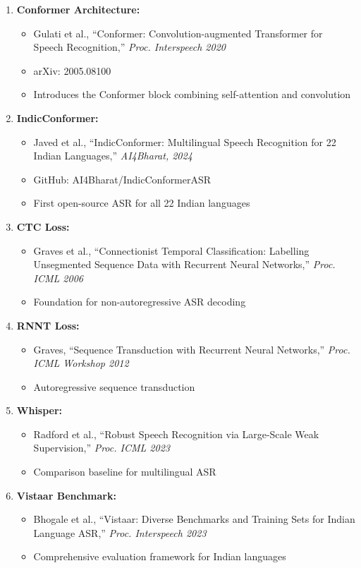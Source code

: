 \documentclass[12pt,a4paper]{article}
\begin{document}
\begin{enumerate}[leftmargin=*]
\item \textbf{Conformer Architecture:}
  \begin{itemize}
  \item Gulati et al., ``Conformer: Convolution-augmented Transformer for Speech Recognition,'' \textit{Proc. Interspeech 2020}
  \item arXiv: 2005.08100
  \item Introduces the Conformer block combining self-attention and convolution
  \end{itemize}

\item \textbf{IndicConformer:}
  \begin{itemize}
  \item Javed et al., ``IndicConformer: Multilingual Speech Recognition for 22 Indian Languages,'' \textit{AI4Bharat, 2024}
  \item GitHub: AI4Bharat/IndicConformerASR
  \item First open-source ASR for all 22 Indian languages
  \end{itemize}

\item \textbf{CTC Loss:}
  \begin{itemize}
  \item Graves et al., ``Connectionist Temporal Classification: Labelling Unsegmented Sequence Data with Recurrent Neural Networks,'' \textit{Proc. ICML 2006}
  \item Foundation for non-autoregressive ASR decoding
  \end{itemize}

\item \textbf{RNNT Loss:}
  \begin{itemize}
  \item Graves, ``Sequence Transduction with Recurrent Neural Networks,'' \textit{Proc. ICML Workshop 2012}
  \item Autoregressive sequence transduction
  \end{itemize}

\item \textbf{Whisper:}
  \begin{itemize}
  \item Radford et al., ``Robust Speech Recognition via Large-Scale Weak Supervision,'' \textit{Proc. ICML 2023}
  \item Comparison baseline for multilingual ASR
  \end{itemize}

\item \textbf{Vistaar Benchmark:}
  \begin{itemize}
  \item Bhogale et al., ``Vistaar: Diverse Benchmarks and Training Sets for Indian Language ASR,'' \textit{Proc. Interspeech 2023}
  \item Comprehensive evaluation framework for Indian languages
  \end{itemize}
\end{enumerate}
\end{document}
